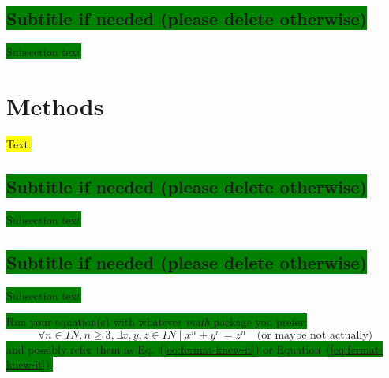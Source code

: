 \documentclass[12pt,a4paper]{article}
\begin{document}
\subsection{\colorbox{green}{Subtitle if needed (please delete otherwise)}}
\colorbox{green}{Subsection text}

\section{Methods}
\colorbox{yellow}{Text.}\par
\subsection{\colorbox{green}{Subtitle if needed (please delete otherwise)}}
\colorbox{green}{Subsection text}
\subsection{\colorbox{green}{Subtitle if needed (please delete otherwise)}}
\colorbox{green}{Subsection text}


\colorbox{green}{
Run your equation(s) with whatever \textit{math} package you prefer:
}
\begin{equation}\label{eq:fermat-knew-it}
\forall  n \in I\!\!N, n \geq 3, \exists x, y, z \in I\!\!N \mid x^n + y^n = z^n \quad \text{(or maybe not actually)}
\end{equation}
\colorbox{green}{and possibly refer them as Eq.~(\ref{eq:fermat-knew-it}) or Equation~(\ref{eq:fermat-knew-it}).}
\end{document}

